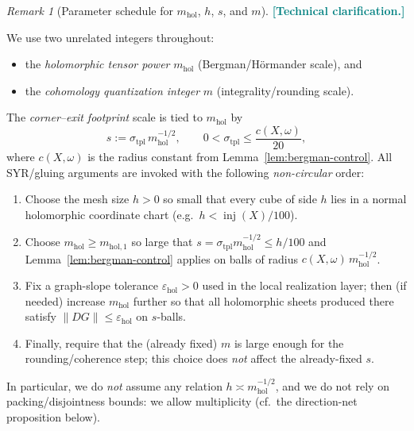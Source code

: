 \documentclass[11pt]{article}
\newcommand{\REVMZ}[1]{\textcolor{teal}{#1}}  %
\numberwithin{equation}{section}  %
\theoremstyle{plain}
\theoremstyle{definition}
\theoremstyle{remark}
\newtheorem{remark}[theorem]{Remark}
\newcommand{\mhol}{m_{\mathrm{hol}}} %
\begin{document}
\begin{remark}[Parameter schedule for $\mhol$, $h$, $s$, and $m$]\label{rem:weighted-scaling}
\REVMZ{\textbf{[Technical clarification.]}}
{
We use two unrelated integers throughout:
\begin{itemize}
\item the \emph{holomorphic tensor power} $\mhol$ (Bergman/H\"ormander scale), and
\item the \emph{cohomology quantization integer} $m$ (integrality/rounding scale).
\end{itemize}
The \emph{corner--exit footprint} scale is tied to $\mhol$ by
\[
s:=\sigma_{\mathrm{tpl}}\,\mhol^{-1/2},\qquad 0<\sigma_{\mathrm{tpl}}\le \frac{c(X,\omega)}{20},
\]
where $c(X,\omega)$ is the radius constant from Lemma~\ref{lem:bergman-control}.  All SYR/gluing arguments are invoked with the following
\emph{non-circular} order:
\begin{enumerate}
\item Choose the mesh size $h>0$ so small that every cube of side $h$ lies in a normal holomorphic coordinate chart (e.g.\ $h<\operatorname{inj}(X)/100$).
\item Choose $\mhol\ge m_{\mathrm{hol},1}$ so large that $s=\sigma_{\mathrm{tpl}}\mhol^{-1/2}\le h/100$ and Lemma~\ref{lem:bergman-control}
applies on balls of radius $c(X,\omega)\,\mhol^{-1/2}$.
\item Fix a graph-slope tolerance $\varepsilon_{\mathrm{hol}}>0$ used in the local realization layer; then (if needed) increase $\mhol$ further so that
all holomorphic sheets produced there satisfy $\|DG\|\le \varepsilon_{\mathrm{hol}}$ on $s$-balls.
\item Finally, require that the (already fixed) $m$ is large enough for the rounding/coherence step; this choice does \emph{not} affect the already-fixed $s$.
\end{enumerate}
In particular, we do \emph{not} assume any relation $h\asymp \mhol^{-1/2}$, and we do not rely on packing/disjointness bounds:
we allow multiplicity (cf.\ the direction-net proposition below).}

\end{remark}
\end{document}
